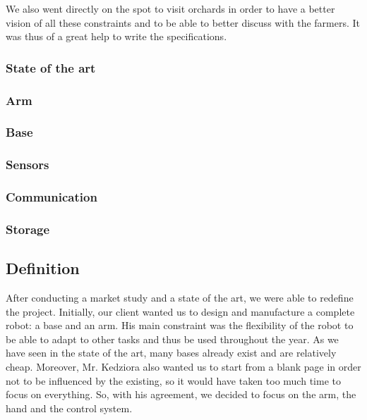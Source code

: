 \bigbreak
We also went directly on the spot to visit orchards in order to have a better vision of all these constraints and to be able to better discuss with the farmers. It was thus of a great help to write the specifications. 

\subsubsection{State of the art}

\subsubsection{Arm}

\subsubsection{Base}

\subsubsection{Sensors}

\subsubsection{Communication}

\subsubsection{Storage}

\subsection{Definition}

\hspace{\parindent} After conducting a market study and a state of the art, we were able to redefine the project. Initially, our client wanted us to design and manufacture a complete robot: a base and an arm. His main constraint was the flexibility of the robot to be able to adapt to other tasks and thus be used throughout the year. As we have seen in the state of the art, many bases already exist and are relatively cheap. Moreover, Mr. Kedziora also wanted us to start from a blank page in order not to be influenced by the existing, so it would have taken too much time to focus on everything. So, with his agreement, we decided to focus on the arm, the hand and the control system. 

